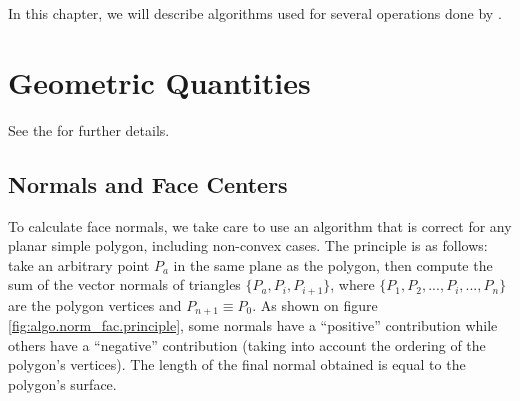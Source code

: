 
%
%
%
%


\nopagebreak

In this chapter, we will describe algorithms used for several
operations done by \CS.

\section*{Geometric Quantities\label{sec:geo_quant}}

\hypertarget{meshquantities}{}

See the  for further details.

\subsection*{Normals and Face Centers%
             \label{sec:geo_quant.normal}}

To calculate face normals, we take care to use an algorithm
that is correct for any planar simple polygon, including non-convex cases.
The principle is as follows: take an arbitrary point $P_a$ in the
same plane as the polygon, then compute the sum of the vector normals
of triangles $\{P_a, P_i, P_{i+1}\}$, where $\{P_1, P_2, ..., P_i, ..., P_n\}$
are the polygon vertices and $P_{n+1} \equiv P_0$. As shown on figure
\ref{fig:algo.norm_fac.principle}, some normals have a ``positive''
contribution while others have a ``negative'' contribution (taking into
account the ordering of the polygon's vertices). The length of the final normal
obtained is equal to the polygon's surface.

